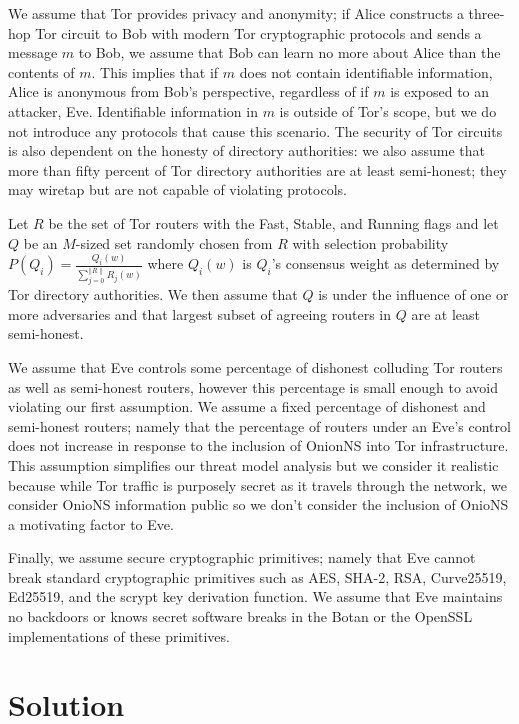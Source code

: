 \documentclass[conference]{IEEEtran}
\newcommand*\concat{\mathbin{\|}}
\begin{document}
We assume that Tor provides privacy and anonymity; if Alice constructs a three-hop Tor circuit to Bob with modern Tor cryptographic protocols and sends a message $ m $ to Bob, we assume that Bob can learn no more about Alice than the contents of $ m $. This implies that if $ m $ does not contain identifiable information, Alice is anonymous from Bob's perspective, regardless of if $ m $ is exposed to an attacker, Eve. Identifiable information in $ m $ is outside of Tor's scope, but we do not introduce any protocols that cause this scenario. The security of Tor circuits is also dependent on the honesty of directory authorities: we also assume that more than fifty percent of Tor directory authorities are at least semi-honest; they may wiretap but are not capable of violating protocols. 

Let $ R $ be the set of Tor routers with the Fast, Stable, and Running flags and let $ Q $ be an $ M $-sized set randomly chosen from $ R $ with selection probability $ P (Q_{i}) = \frac{Q_{i}(w)}{\sum_{j=0}^{\concat R \concat} R_{j}(w)} $ where $ Q_{i}(w) $ is $ Q_{i} $'s consensus weight as determined by Tor directory authorities. We then assume that $ Q $ is under the influence of one or more adversaries and that largest subset of agreeing routers in $ Q $ are at least semi-honest.


We assume that Eve controls some percentage of dishonest colluding Tor routers as well as semi-honest routers, however this percentage is small enough to avoid violating our first assumption. We assume a fixed percentage of dishonest and semi-honest routers; namely that the percentage of routers under an Eve's control does not increase in response to the inclusion of OnionNS into Tor infrastructure. This assumption simplifies our threat model analysis but we consider it realistic because while Tor traffic is purposely secret as it travels through the network, we consider OnioNS information public so we don't consider the inclusion of OnioNS a motivating factor to Eve.

Finally, we assume secure cryptographic primitives; namely that Eve cannot break standard cryptographic primitives such as AES, SHA-2, RSA, Curve25519, Ed25519, and the scrypt key derivation function. We assume that Eve maintains no backdoors or knows secret software breaks in the Botan or the OpenSSL implementations of these primitives.

\section{Solution}
\label{sec:Solution}
\end{document}
